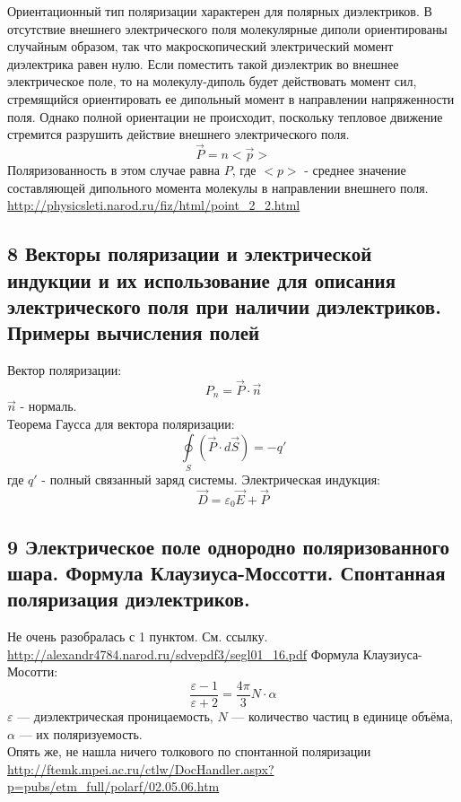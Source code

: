 \documentclass[a4paper,12pt]{article}
\begin{document}
Ориентационный тип поляризации характерен для полярных диэлектриков. В отсутствие внешнего электрического поля молекулярные диполи ориентированы случайным образом, так что макроскопический электрический момент диэлектрика равен нулю. Если поместить такой диэлектрик во внешнее электрическое поле, то на молекулу-диполь будет действовать момент сил, стремящийся ориентировать ее дипольный момент в направлении напряженности поля. Однако полной ориентации не происходит, поскольку тепловое движение стремится разрушить действие внешнего электрического поля.\\
\begin{equation}
	\vec{P} = n <\vec{p}>
\end{equation}
Поляризованность в этом случае равна $P$, где $<p>$ - среднее значение составляющей дипольного момента молекулы в направлении внешнего поля.\\
\url{http://physicsleti.narod.ru/fiz/html/point_2_2.html}

\subsection{8   Векторы поляризации и электрической индукции и их использование для описания электрического поля при наличии диэлектриков. Примеры вычисления полей}
Вектор поляризации:\\
\begin{equation}
	P_n = \vec{P} \cdot \vec{n}
\end{equation}
$\vec{n}$ - нормаль.\\
Теорема Гаусса для вектора поляризации:
\begin{equation}
	\oint\limits_S {(\vec{P} \cdot d \vec{S})} = -q'
\end{equation}
где $ q' $ - полный связанный заряд системы.
Электрическая индукция:\\
\begin{equation}
	\vec{D} = \varepsilon _0 \vec{E} + \vec{P}
\end{equation}

\subsection{9   Электрическое поле однородно поляризованного шара. Формула Клаузиуса-Моссотти. Спонтанная поляризация диэлектриков.}
Не очень разобралась с 1 пунктом. См. ссылку.\\
\url{http://alexandr4784.narod.ru/sdvepdf3/segl01_16.pdf}
Формула Клаузиуса-Мосотти:\\
\begin{equation}
	\frac{\varepsilon - 1}{\varepsilon + 2} = \frac{4 \pi}{3} N \cdot \alpha
\end{equation}
$\varepsilon$ — диэлектрическая проницаемость, $N$ — количество частиц в единице объёма, $\alpha$ — их поляризуемость.\\
Опять же, не нашла ничего толкового по спонтанной поляризации\\
\url{http://ftemk.mpei.ac.ru/ctlw/DocHandler.aspx?p=pubs/etm_full/polarf/02.05.06.htm}
\end{document}
